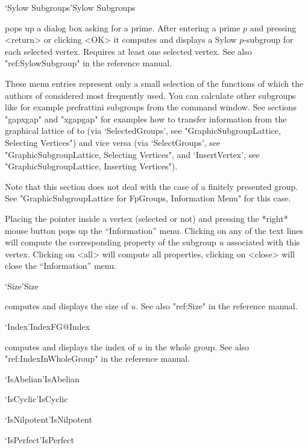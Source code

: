 \>`Sylow Subgroups'{Sylow Subgroups}

pops  up a dialog  box asking   for a prime.   After entering  a  prime $p$ 
and pressing  <return> or  clicking  <OK> it computes   and displays  a Sylow
$p$-subgroup  for   each selected vertex.  Requires   at   least one selected
vertex.  See also "ref:SylowSubgroup" in the {\GAP}
reference manual.

\bigskip

These menu entries represent only a small selection of the functions
of {\GAP} which the authors of {\XGAP} considered most frequently
used. You can calculate other subgroups like for example prefrattini
subgroups from the {\GAP} command window. See sections "gapxgap" and
"xgapgap" for examples how to transfer information from the graphical
lattice of {\XGAP} to {\GAP} (via `SelectedGroups', see
"GraphicSubgroupLattice, Selecting Vertices") and vice versa (via
`SelectGroups', see "GraphicSubgroupLattice, Selecting Vertices", and
`InsertVertex', see "GraphicSubgroupLattice, Inserting Vertices").



Note that this section does not deal with the case of a finitely presented
group. See "GraphicSubgroupLattice for FpGroups, Information Menu" for this 
case.

Placing the pointer  inside a vertex (selected  or not)  and pressing the
*right* mouse button pops up the  ``Information'' menu.  Clicking on any of
the text  lines will compute  the corresponding  property of the subgroup
$u$ associated  with  this vertex.  Clicking   on <all> will  compute all
properties, clicking on <close> will close the ``Information'' menu.

\>`Size'{Size}

computes and displays the size of $u$.  See also "ref:Size" in the
{\GAP} reference manual.

\>`Index'{IndexFG}@{Index}

computes and displays the  index  of $u$ in   the whole group.  See  also
"ref:IndexInWholeGroup" in the {\GAP} reference manual.

\>`IsAbelian'{IsAbelian}

\>`IsCyclic'{IsCyclic}

\>`IsNilpotent'{IsNilpotent}

\>`IsPerfect'{IsPerfect}

